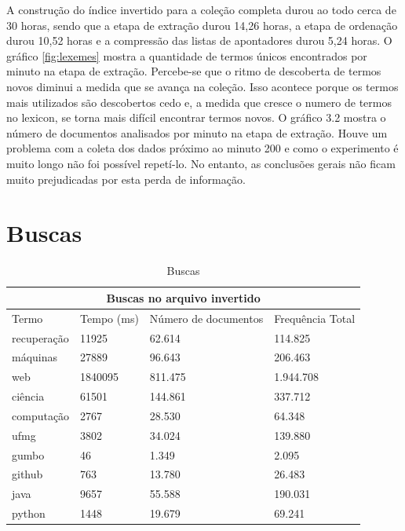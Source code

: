 \documentclass{report}
\begin{document}
A construção do índice invertido para a coleção completa durou ao todo cerca de 30 horas, sendo que a etapa de extração durou 14,26 horas, a etapa de ordenação durou 10,52 horas e a compressão das listas de apontadores durou 5,24 horas. O gráfico \ref{fig:lexemes} mostra a quantidade de termos únicos encontrados por minuto na etapa de extração. Percebe-se que o ritmo de descoberta de termos novos diminui a medida que se avança na coleção. Isso acontece porque os termos mais utilizados são descobertos cedo e, a medida
que cresce o numero de termos no lexicon, se torna mais difícil encontrar termos novos. O gráfico 3.2 mostra o número de documentos analisados
por minuto na etapa de extração. Houve um problema com a coleta dos dados próximo ao minuto 200 e como o experimento é muito longo não foi possível repetí-lo. 
No entanto, as conclusões gerais não ficam muito prejudicadas por esta perda de informação.

\section{Buscas}

\begin{table}
\centering
\begin{tabular}{ |l|l|l|l| }
  \hline
  \multicolumn{4}{|c|}{Buscas no arquivo invertido} \\
  \hline
  Termo          & Tempo (ms)     & Número de documentos & Frequência Total \\
  \hline                             
  recuperação    & 11925          & 62.614               & 114.825          \\
  máquinas       & 27889          & 96.643               & 206.463          \\
  web            & 1840095        & 811.475              & 1.944.708        \\               
  ciência        & 61501          & 144.861              & 337.712          \\               
  computação     & 2767           & 28.530               & 64.348           \\              
  ufmg           & 3802           & 34.024               & 139.880          \\               
  gumbo          & 46             & 1.349                & 2.095            \\               
  github         & 763            & 13.780               & 26.483           \\               
  java           & 9657           & 55.588               & 190.031          \\               
  python         & 1448           & 19.679               & 69.241           \\               
  \hline
\end{tabular}
\caption{Buscas}
\label{tab:search}
\end{table}
\end{document}
